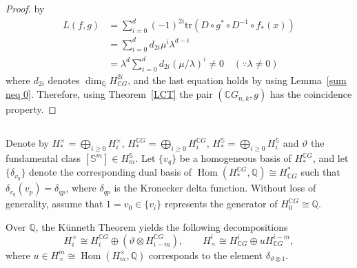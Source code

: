 \documentclass{amsart}
\newcommand{\thmref}[1]{Theorem~\ref{#1}}
\newcommand{\lemref}[1]{Lemma~\ref{#1}}
\begin{document}
\begin{proof}
by
		\[
		\begin{array}{ll}
			L(f,g) &= \sum_{i=0}^d (-1)^{2i}
			\mathrm{tr}(D\circ g^*\circ D^{-1}\circ f_*(x)) \\[6pt]
			&=  \sum_{i=0}^d d_{2i}\mu^i\lambda^{d-i}  \\[6pt]
			&= \lambda^d \sum_{i=0}^d d_{2i}(\mu/\lambda)^i \neq 0 \quad (\because \lambda\neq 0) 
		\end{array}
		\]
		where %
$d_{2i}$ %
denotes $\dim_{\mathbb Q}H^{2i}_{\mathbb CG}$, and %
the last equation holds by using \lemref{sum neq 0}. Therefore, using \thmref{LCT} the pair $(\mathbb{C}G_{n,k},g)$ has the coincidence property.
	\end{proof}
	
	\subsection{} Denote by $H_*^\times = \bigoplus_{i\geq 0} H_i^{\times},\, H_*^{\mathbb{C}G} = \bigoplus_{i\geq 0} H_i^{\mathbb{C}G},\, H_*^{\mathbb{S}} = \bigoplus_{i\geq 0} H_i^{\mathbb{S}}$ and $\vartheta$ the fundamental class $[\mathbb S^m]\in H_m^{\mathbb S}$. Let $\{v_q\}$ be a homogeneous basis of $H_*^{\mathbb{C}G}$, and let $\{\delta_{v_q}\}$ denote the corresponding dual basis of  
$\operatorname{Hom}(H_*^{\mathbb{C}G}, \mathbb Q) \cong H^*_{\mathbb{C}G}$ such %
that  
	$ \delta_{v_q} (v_p) = \delta_{qp}$, where %
$\delta_{qp}$ is the Kronecker delta function. Without loss of generality, assume that $1=v_0 \in \{v_i\}$ represents the generator of $H_0^{\mathbb{C}G} \cong \mathbb Q$.
	
	Over $\mathbb Q$, the K\"unneth Theorem yields the following decompositions 
	\begin{equation}\label{kunneth}
		H_i^\times \cong H_i^{\mathbb{C}G} \oplus (\vartheta \otimes H_{i-m}^{\mathbb{C}G}), 
		\qquad 
		H^i_\times \cong H^i_{\mathbb{C}G} \oplus uH^{i-m}_{\mathbb{C}G},
	\end{equation}
	where  $u \in H^m_{\times} \cong \operatorname{Hom}(H_m^{\times}, \mathbb Q)$ corresponds to the element $\delta_{\vartheta\otimes 1}$.
	
\end{document}

